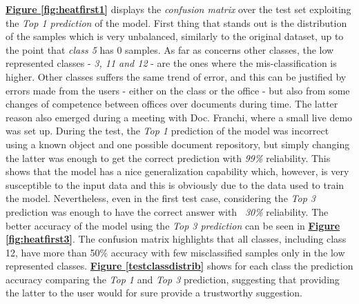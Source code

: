 \documentclass[12pt]{article}
\begin{document}
\hyperref[fig:heatfirst1]{\textbf{Figure \ref{fig:heatfirst1}}} displays the \textit{confusion matrix} over the test set exploiting the \textit{Top 1 prediction} of the model. First thing that stands out is the distribution of the samples which is very unbalanced, similarly to the original dataset, up to the point that \textit{class 5} has 0 samples. As far as concerns other classes, the low represented classes - \textit{3, 11 and 12} - are the ones where the mis-classification is higher. Other classes suffers the same trend of error, and this can be justified by errors made from the users - either on the class or the office - but also from some changes of competence between offices over documents during time. The latter reason also emerged during a meeting with Doc. Franchi, where a small live demo was set up. During the test, the \textit{Top 1} prediction of the model was incorrect using a known object and one possible document repository, but simply changing the latter was enough to get the correct prediction with \textit{99\%} reliability. This shows that the model has a nice generalization capability which, however, is very susceptible to the input data and this is obviously due to the data used to train the model. Nevertheless, even in the first test case, considering the \textit{Top 3} prediction was enough to have the correct answer with \textit{~30\%} reliability. The better accuracy of the model using the \textit{Top 3 prediction} can be seen in \hyperref[fig:heatfirst3]{\textbf{Figure \ref{fig:heatfirst3}}}. The confusion matrix highlights that all classes, including class 12, have more than 50\% accuracy with few misclassified samples only in the low represented classes. \hyperref[testclassdistrib]{\textbf{Figure \ref{testclassdistrib}}} shows for each class the prediction accuracy comparing the \textit{Top 1} and \textit{Top 3} prediction, suggesting that providing the latter to the user would for sure provide a trustworthy suggestion.
\end{document}
